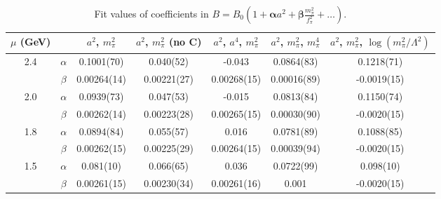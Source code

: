 \documentclass[12pt]{extarticle}
\begin{document}
\begin{table}[h!]
\begin{center}
\begin{tabular}{|c c|c|c|c|c|c|}
\hline
$\mu$ (GeV) &  & $a^2$, $m_\pi^2$& $a^2$, $m_\pi^2$ (no C)& $a^2$, $a^4$, $m_\pi^2$& $a^2$, $m_\pi^2$, $m_\pi^4$& $a^2$, $m_\pi^2$, $\log(m_\pi^2/\Lambda^2)$\\
\hline
\multirow{2}{0.5in}{2.4} & $\alpha$ & 0.1001(70)& 0.040(52)& -0.043& 0.0864(83)& 0.1218(71)\\
 & $\beta$ & 0.00264(14)& 0.00221(27)& 0.00268(15)& 0.00016(89)& -0.0019(15)\\
\hline
\multirow{2}{0.5in}{2.0} & $\alpha$ & 0.0939(73)& 0.047(53)& -0.015& 0.0813(84)& 0.1150(74)\\
 & $\beta$ & 0.00262(14)& 0.00223(28)& 0.00265(15)& 0.00030(90)& -0.0020(15)\\
\hline
\multirow{2}{0.5in}{1.8} & $\alpha$ & 0.0894(84)& 0.055(57)& 0.016& 0.0781(89)& 0.1088(85)\\
 & $\beta$ & 0.00262(15)& 0.00225(29)& 0.00264(15)& 0.00039(94)& -0.0020(15)\\
\hline
\multirow{2}{0.5in}{1.5} & $\alpha$ & 0.081(10)& 0.066(65)& 0.036& 0.0722(99)& 0.098(10)\\
 & $\beta$ & 0.00261(15)& 0.00230(34)& 0.00261(16)& 0.001& -0.0020(15)\\
\hline
\end{tabular}
\caption{Fit values of coefficients in $B = B_0(1 + \mathbf{\alpha} a^2 + \mathbf{\beta} \frac{m_\pi^2}{f_\pi^2} + \ldots)$.}
\end{center}
\end{table}




















\clearpage
\end{document}

